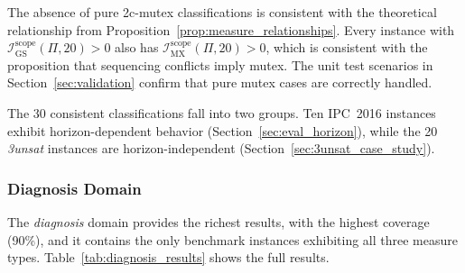 

The absence of pure 2c-mutex classifications is consistent with the theoretical relationship from Proposition~\ref{prop:measure_relationships}. Every instance with $\mathcal{I}^{\text{scope}}_{\text{GS}}(\Pi, 20) > 0$ also has $\mathcal{I}^{\text{scope}}_{\text{MX}}(\Pi, 20) > 0$, which is consistent with the proposition that sequencing conflicts imply mutex. The unit test scenarios in Section~\ref{sec:validation} confirm that pure mutex cases are correctly handled.

The 30 consistent classifications fall into two groups. Ten \ac{IPC}~2016 instances exhibit horizon-dependent behavior (Section~\ref{sec:eval_horizon}), while the 20 \textit{3unsat} instances are horizon-independent (Section~\ref{sec:3unsat_case_study}).

\subsubsection{Diagnosis Domain}

The \textit{diagnosis} domain provides the richest results, with the highest coverage (90\%), and it contains the only benchmark instances exhibiting all three measure types. Table~\ref{tab:diagnosis_results} shows the full results.

